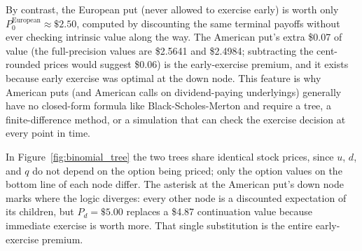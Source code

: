 \documentclass[../ai_in_finance]{subfiles}
\begin{document}
By contrast, the European put (never allowed to exercise early) is worth only $P_0^{\text{European}} \approx \$2.50$, computed by discounting the same terminal payoffs without ever checking intrinsic value along the way. The American put's extra \$0.07 of value (the full-precision values are \$2.5641 and \$2.4984; subtracting the cent-rounded prices would suggest \$0.06) is the early-exercise premium, and it exists because early exercise was optimal at the down node. This feature is why American puts (and American calls on dividend-paying underlyings) generally have no closed-form formula like Black-Scholes-Merton and require a tree, a finite-difference method, or a simulation that can check the exercise decision at every point in time.

In Figure~\ref{fig:binomial_tree} the two trees share identical stock prices, since $u$, $d$, and $q$ do not depend on the option being priced; only the option values on the bottom line of each node differ. The asterisk at the American put's down node marks where the logic diverges: every other node is a discounted expectation of its children, but $P_d=\$5.00$ replaces a \$4.87 continuation value because immediate exercise is worth more. That single substitution is the entire early-exercise premium.
\end{document}
